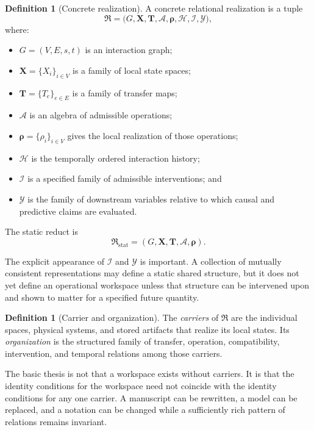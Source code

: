 \documentclass[11pt,letterpaper]{article}
\theoremstyle{plain}
\theoremstyle{definition}
\newtheorem{definition}[theorem]{Definition}
\begin{document}
\begin{definition}[Concrete realization]\label{def:realization}
A concrete relational realization is a tuple
\[
\mathfrak R
=
\bigl(
G,\mathbf X,\mathbf T,\mathcal A,\boldsymbol\rho,
\mathcal H,\mathcal I,\mathcal Y
\bigr),
\]
where:
\begin{itemize}
\item \(G=(V,E,s,t)\) is an interaction graph;
\item \(\mathbf X=\{X_i\}_{i\in V}\) is a family of local state spaces;
\item \(\mathbf T=\{T_e\}_{e\in E}\) is a family of transfer maps;
\item \(\mathcal A\) is an algebra of admissible operations;
\item \(\boldsymbol\rho=\{\rho_i\}_{i\in V}\) gives the local realization of those operations;
\item \(\mathcal H\) is the temporally ordered interaction history;
\item \(\mathcal I\) is a specified family of admissible interventions; and
\item \(\mathcal Y\) is the family of downstream variables relative to which causal and predictive claims are evaluated.
\end{itemize}
The static reduct is
\[
\mathfrak R_{\mathrm{stat}}
=
(G,\mathbf X,\mathbf T,\mathcal A,\boldsymbol\rho).
\]
\end{definition}

The explicit appearance of \(\mathcal I\) and \(\mathcal Y\) is important.
A collection of mutually consistent representations may define a static
shared structure, but it does not yet define an operational workspace unless
that structure can be intervened upon and shown to matter for a specified
future quantity.

\begin{definition}[Carrier and organization]\label{def:carrier-organization}
The \emph{carriers} of \(\mathfrak R\) are the individual spaces, physical
systems, and stored artifacts that realize its local states. Its
\emph{organization} is the structured family of transfer, operation,
compatibility, intervention, and temporal relations among those carriers.
\end{definition}

The basic thesis is not that a workspace exists without carriers. It is that
the identity conditions for the workspace need not coincide with the identity
conditions for any one carrier. A manuscript can be rewritten, a model can
be replaced, and a notation can be changed while a sufficiently rich pattern
of relations remains invariant.
\end{document}
